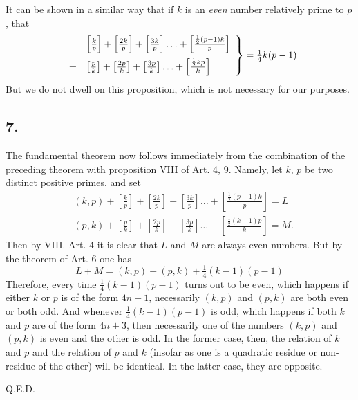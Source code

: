 \documentclass[14pt]{memoir}
\theoremstyle{plain}
\theoremstyle{remark}
\begin{document}
It can be shown in a similar way that if $k$ is an \emph{even} number relatively prime to $p$, that
\[ \left. \begin{array}{rl} &\left[\tfrac{k}{p}\right] + \left[\tfrac{2k}{p}\right] + \left[\tfrac{3k}{p}\right] \ldots + \left[\tfrac{\frac{1}{2}(p-1)k}{p}\right]  \vspace{2mm}\\
+& \left[\tfrac{p}{k}\right] + \left[\tfrac{2p}{k}\right] + \left[\tfrac{3p}{k}\right] \ldots + \left[\tfrac{\frac{1}{2}kp}{k}\right] \end{array} \right\} = \tfrac{1}{4}k(p-1) \]
But we do not dwell on this proposition, which is not necessary for our purposes.

\subsection*{7.} 

The fundamental theorem now follows immediately from the combination of the preceding theorem with proposition VIII of Art. 4, 9.  Namely, let $k$, $p$ be two distinct positive primes, and set
\begin{align*} &(k,p) + \left[\tfrac{k}{p}\right] + \left[\tfrac{2k}{p}\right] + \left[\tfrac{3k}{p}\right] \ldots + \left[\tfrac{\frac{1}{2}(p-1)k}{p}\right] = L \\
&(p,k) + \left[\tfrac{p}{k}\right] + \left[\tfrac{2p}{k}\right] + \left[\tfrac{3p}{k}\right] \ldots + \left[\tfrac{\frac{1}{2}(k-1)p}{k}\right] = M. \end{align*}
Then by VIII. Art. 4 it is clear that $L$ and $M$ are always even numbers.   But by the theorem of Art. 6 one has
\[ L + M = (k,p) + (p,k) + \tfrac{1}{4}(k-1)(p-1) \]
Therefore, every time $\tfrac{1}{4}(k-1)(p-1)$ turns out to be even, which happens if either $k$ or $p$ is of the form $4n+1$, necessarily $(k,p)$ and $(p,k)$ are both even or both odd.  And whenever $\tfrac{1}{4}(k-1)(p-1)$ is odd, which happens if both $k$ and $p$ are of the form $4n+3$, then necessarily one of the numbers $(k,p)$ and $(p,k)$ is even and the other is odd.  In the former case, then, the relation of $k$ and $p$ and the relation of $p$ and $k$ (insofar as one is a quadratic residue or non-residue of the other) will be identical.  In the latter case, they are opposite. 

\quad Q.E.D. 
\end{document}
